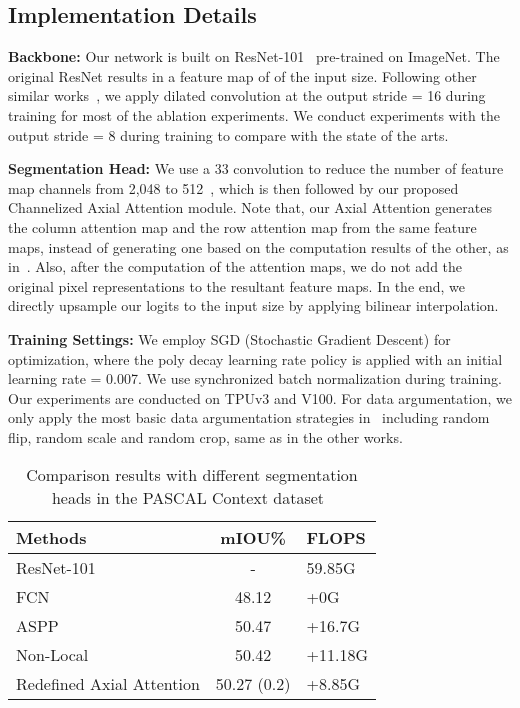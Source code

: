 \documentclass[journal]{IEEEtran}
\begin{document}
\subsection{Implementation Details}

\textbf{Backbone:} 
Our network is built on ResNet-101~\cite{cResnet} pre-trained on ImageNet. 
The original ResNet results in a feature map of  of the input size. 
Following other similar works~\cite{cDeepLabV3Plus, cAxialDeepLab, cEMANet}, we apply dilated convolution at the output stride = 16 during training for most of the ablation experiments. We conduct experiments with the output stride = 8 during training to compare with the state of the arts. 

\textbf{Segmentation Head:} 
We use a 33 convolution to reduce the number of feature map channels from 2,048 to 512~\cite{cDualAttention,cEMANet}, which is then followed by our proposed Channelized Axial Attention module. 
Note that, our Axial Attention generates the column attention map and the row attention map from the same feature maps, instead of generating one based on the computation results of the other, as in~\cite{cAxialDeepLab}. 
Also, after the computation of the attention maps, we do not add the original pixel representations to the resultant feature maps. 
In the end, we directly upsample our logits to the input size by applying bilinear interpolation.

\textbf{Training Settings:} 
We employ SGD (Stochastic Gradient Descent) for optimization, where the poly decay learning rate policy  is applied with an initial learning rate = 0.007. We use synchronized batch normalization during training.
Our experiments are conducted on TPUv3 and V100.
For data argumentation, we only apply the most basic data argumentation strategies in~\cite{cDeepLabV3Plus} including random flip, random scale and random crop, same as in the other works.

\begin{table}[t]
	\centering
\caption{Comparison results with different segmentation heads in the PASCAL Context dataset~\cite{cPascalContext}}
	\begin{tabular}{l|c|l} 
		\toprule[1pt]
		Methods & mIOU\% & FLOPS \\
		\midrule[0.5pt]
		\midrule[0.5pt]
		ResNet-101~\cite{cResnet} & - & 59.85G \\
		\midrule
		FCN~\cite{cFCN} &  48.12  &+0G\\
		ASPP~\cite{cDeepLabV3Plus} &50.47    &+16.7G              \\
		Non-Local~\cite{cNonLocal} &50.42  &+11.18G  \\
		Redefined Axial Attention&   50.27 (0.2)  &+8.85G   \\
		\bottomrule[1.pt]
	\end{tabular}
	\label{table:segheads}
\end{table}
\end{document}

